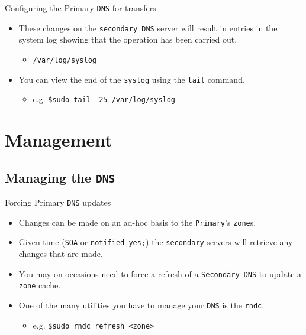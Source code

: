 \documentclass[xcolor=table]{beamer}
\begin{document}
\begin{frame}{Configuring the Primary \texttt{DNS} for transfers}
  \begin{itemize}
    \item These changes on the \texttt{secondary DNS} server will result in entries in the system log showing that the operation has been carried out.
      \begin{itemize}
        \item \texttt{/var/log/syslog}
      \end{itemize}
    \item You can view the end of the \texttt{syslog} using the \texttt{tail} command.
      \begin{itemize}
        \item e.g. \texttt{\$sudo tail -25 /var/log/syslog}
      \end{itemize}
  \end{itemize}
\end{frame}

\section{Management}
\subsection{Managing the \texttt{DNS}}
\begin{frame}{Forcing Primary \texttt{DNS} updates}
  \begin{itemize}
    \item Changes can be made on an ad-hoc basis to the \texttt{Primary}'s \texttt{zone}s.
    \item Given time (\texttt{SOA} or \texttt{notified yes;}) the \texttt{secondary} servers will retrieve any changes that are made.
    \item You may on occasions need to force a refresh of a \texttt{Secondary DNS} to update a \texttt{zone} cache.
    \item One of the many utilities you have to manage your \texttt{DNS} is the \texttt{rndc}.
      \begin{itemize}
        \item e.g. \texttt{\$sudo rndc refresh <zone>}
      \end{itemize}
  \end{itemize}
\end{frame}
\end{document}
